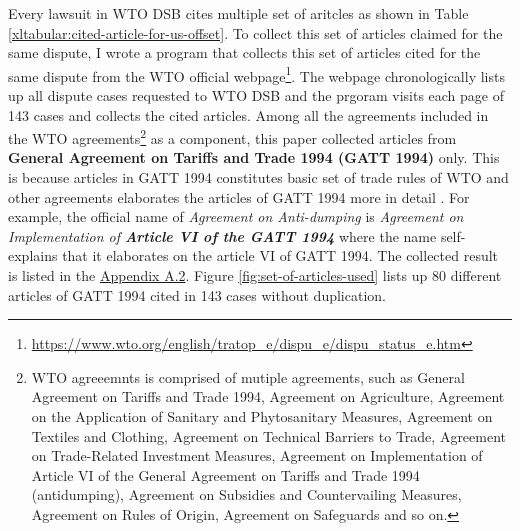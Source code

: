 Every lawsuit in WTO DSB 
cites multiple set of aritcles
as shown in Table 
\ref{xltabular:cited-article-for-us-offset}. 
To collect this set of articles claimed for the same dispute, I wrote a program that collects this set of articles cited for the same dispute from the WTO official webpage\footnote{\url{https://www.wto.org/english/tratop_e/dispu_e/dispu_status_e.htm}}. 
The webpage chronologically lists up all dispute cases
requested to WTO DSB and the prgoram visits each page of 143 cases
and collects the cited articles. Among all the agreements included in the WTO agreements\footnote{
    WTO agreeemnts is comprised of mutiple agreements, such as
    General Agreement on Tariffs and Trade 1994,
    Agreement on Agriculture,
    Agreement on the Application of Sanitary and Phytosanitary Measures,
    Agreement on Textiles and Clothing,
    Agreement on Technical Barriers to Trade,
    Agreement on Trade-Related Investment Measures,
    Agreement on Implementation of Article VI of the General Agreement on Tariffs and Trade 1994 (antidumping),
    Agreement on Subsidies and Countervailing Measures,
    Agreement on Rules of Origin,
    Agreement on Safeguards and so on.
    } as a component,
this paper collected articles from \textbf{General Agreement on Tariffs and Trade 1994 (GATT 1994)} only. 
This is because articles in GATT 1994 constitutes basic set of trade rules of WTO and other agreements 
elaborates the articles of GATT 1994 more in detail \citep{world1999wto}. For example, the official name of \textit{Agreement on Anti-dumping}
is \textit{Agreement on Implementation of \textbf{Article VI of the GATT 1994}}
where the name self-explains that it elaborates on the article VI of GATT 1994.
The collected result is listed in the \hyperref[sub:cited-articles-table]{Appendix A.2}. Figure \ref{fig:set-of-articles-used} 
lists up 80 different articles of GATT 1994 cited in 143 cases without duplication.


